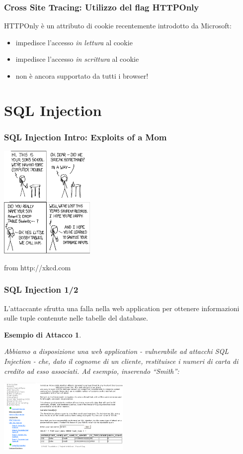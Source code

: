 \documentclass{beamer}
\newtheorem{myexample}{Esempio di Attacco}
\begin{document}
\begin{frame}
  \frametitle{Cross Site Tracing: Utilizzo del flag HTTPOnly}
  HTTPOnly \`e un attributo di cookie recentemente introdotto da Microsoft:
  \pause
  \begin{itemize}
  \item impedisce l'accesso \emph{in lettura} al cookie
    \pause
  \item impedisce l'accesso \emph{in scrittura} al cookie
    \pause
  \item \alert{non \`e ancora supportato da tutti i browser!}
  \end{itemize}
\end{frame}

\section{SQL Injection}
\begin{frame}
\frametitle{SQL Injection Intro: Exploits of a Mom}
      \begin{center}
	\includegraphics[width=130pt]{images/exploits_of_a_mom.png}
	\newline
	\begin{tiny}from http://xkcd.com \end{tiny}
      \end{center}
\end{frame}

\begin{frame}
  \frametitle{SQL Injection 1/2}
  L'attaccante sfrutta una falla nella web application per ottenere informazioni sulle tuple contenute nelle tabelle del database.
  \pause
  \begin{myexample}
    \begin{tiny}
      Abbiamo a disposizione una web application - vulnerabile ad attacchi SQL Injection - che, dato il cognome di un cliente, restituisce i numeri di carta di credito ad esso associati. Ad esempio, inserendo ``Smith'':
      \newline
      \begin{center}
	\includegraphics[width=180pt]{images/sql_injection_1.png}
      \end{center}
    \end{tiny}
  \end{myexample}
\end{frame}
\end{document}
